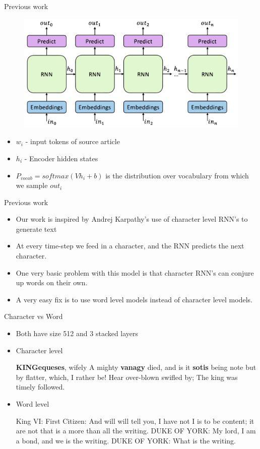 \documentclass{beamer}
\begin{document}
\begin{frame}{Previous work}
\begin{figure}
        \includegraphics[width=0.8\linewidth]{1.pdf}
    \end{figure}
    \begin{itemize}
        \item $w_i$ - input tokens of source article       
        \item $h_i$ - Encoder hidden states
        \item $P_{vocab} = softmax(Vh_i + b)$ is the distribution over vocabulary from which we sample $out_i$
    \end{itemize}
\end{frame}

\begin{frame}{Previous work}
\begin{itemize}
\item Our work is inspired by Andrej Karpathy's use of character level RNN's to generate text
\item At every time-step we feed in a character, and the RNN predicts the next character.
\item One very basic problem with this model is that character RNN's can conjure up words on their own.
\item A very easy fix is to use word level models instead of character level models.
\end{itemize}
\end{frame}


\begin{frame}{Character vs Word}
\begin{itemize}
\item Both have size 512 and 3 stacked layers
\item Character level
\begin{block}{}
	\textbf{KINGequeses}, wifely
A mighty \textbf{vanagy} died, and is it \textbf{sotis} being note but by flatter, which,
I rather be! Hear over-blown swifled by;
The king was timely followed.
\end{block}
\item Word level
\begin{block}{}
King VI: First Citizen: And will will tell you, I have not I is to be content; it are not that is a more than all the writing. DUKE OF YORK: My lord, I am a bond, and we is the writing. DUKE OF YORK: What is the writing.
\end{block}
\end{itemize}
\end{frame}
\end{document}
